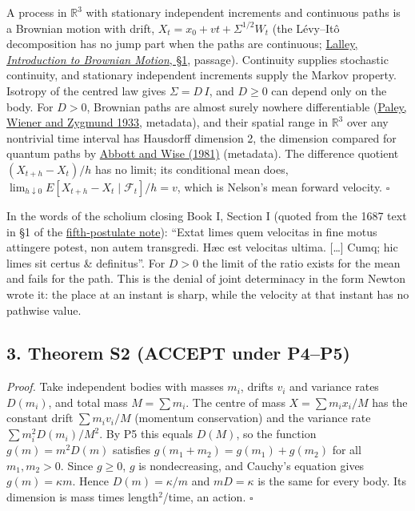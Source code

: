 \documentclass[11pt,a4paper]{article}
\begin{document}
A process in \(\mathbb R^3\) with stationary independent increments and
continuous paths is a Brownian motion with drift,
\(X_t=x_0+vt+\Sigma^{1/2}W_t\) (the Lévy--Itô decomposition has no jump
part when the paths are continuous;
\href{https://galton.uchicago.edu/~lalley/Courses/383/BrownianMotion.pdf}{Lalley,
\emph{Introduction to Brownian Motion}, §1}, passage). Continuity
supplies stochastic continuity, and stationary independent increments
supply the Markov property. Isotropy of the centred law gives
\(\Sigma=D\,I\), and \(D\ge0\) can depend only on the body. For \(D>0\),
Brownian paths are almost surely nowhere differentiable
(\href{https://doi.org/10.1007/BF01474606}{Paley, Wiener and Zygmund
1933}, metadata), and their spatial range in \(\mathbb R^3\) over any
nontrivial time interval has Hausdorff dimension 2, the dimension
compared for quantum paths by
\href{https://doi.org/10.1119/1.12657}{Abbott and Wise (1981)}
(metadata). The difference quotient \((X_{t+h}-X_t)/h\) has no limit;
its conditional mean does,
\(\lim_{h\downarrow0}E[X_{t+h}-X_t\mid\mathcal F_t]/h=v\), which is
Nelson's mean forward velocity. \(\square\)

In the words of the scholium closing Book I, Section I (quoted from the
1687 text in §1 of the
\href{principia-fifth-postulate.md}{fifth-postulate note}): ``Extat
limes quem velocitas in fine motus attingere potest, non autem
transgredi. Hæc est velocitas ultima. {[}\ldots{]} Cumq; hic limes sit
certus \& definitus''. For \(D>0\) the limit of the ratio exists for the
mean and fails for the path. This is the denial of joint determinacy in
the form Newton wrote it: the place at an instant is sharp, while the
velocity at that instant has no pathwise value.

\hypertarget{theorem-s2-accept-under-p4p5}{%
\subsection{3. Theorem S2 (ACCEPT under
P4--P5)}\label{theorem-s2-accept-under-p4p5}}

\emph{Proof.} Take independent bodies with masses \(m_i\), drifts
\(v_i\) and variance rates \(D(m_i)\), and total mass \(M=\sum m_i\).
The centre of mass \(X=\sum m_ix_i/M\) has the constant drift
\(\sum m_iv_i/M\) (momentum conservation) and the variance rate
\(\sum m_i^2D(m_i)/M^2\). By P5 this equals \(D(M)\), so the function
\(g(m)=m^2D(m)\) satisfies \(g(m_1+m_2)=g(m_1)+g(m_2)\) for all
\(m_1,m_2>0\). Since \(g\ge0\), \(g\) is nondecreasing, and Cauchy's
equation gives \(g(m)=\kappa m\). Hence \(D(m)=\kappa/m\) and
\(mD=\kappa\) is the same for every body. Its dimension is mass times
length\(^2\)/time, an action. \(\square\)
\end{document}
